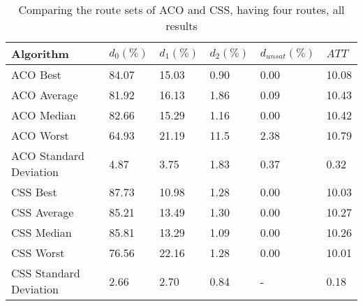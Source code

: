    \begin{table}[H]
    \centering
    \begin{tabular}{|l||l|l|l|l|l|}
    \hline
    Algorithm & $d_0(\%)$ & $d_1(\%)$ & $d_2(\%)$ & $d_{unsat}(\%)$ & $ATT$ \\
    \hline
    ACO Best & 84.07 & 15.03 & 0.90 & 0.00 & 10.08\\
    ACO Average & 81.92 & 16.13 & 1.86 & 0.09 & 10.43\\
    ACO Median & 82.66 & 15.29 & 1.16 & 0.00 & 10.42\\
    ACO Worst & 64.93 & 21.19 & 11.5 & 2.38 & 10.79\\
    ACO Standard Deviation & 4.87 & 3.75 & 1.83 & 0.37 & 0.32\\
    \hline
    \hline
    CSS Best & 87.73 & 10.98 & 1.28 & 0.00 & 10.03\\
    CSS Average & 85.21 & 13.49 & 1.30 & 0.00 & 10.27\\
    CSS Median & 85.81 & 13.29 & 1.09 & 0.00 & 10.26\\
    CSS Worst & 76.56 & 22.16 & 1.28 & 0.00 & 10.01\\
    CSS Standard Deviation & 2.66 & 2.70 & 0.84 & - & 0.18\\
    \hline
    \end{tabular}
    \caption {Comparing the route sets of ACO and CSS, having four routes, all results}
    \label{table:performanceComparison_ACOFull}
    \end{table}



